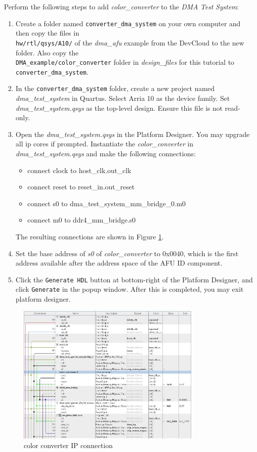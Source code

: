 \documentclass[11pt, twoside, pdftex]{article}
\begin{document}
\noindent
Perform the following steps to add {\it color\_converter} to the {\it DMA Test System}:
\begin{enumerate}
    \item Create a folder named \texttt{converter\_dma\_system} on your own computer and then copy the files in\\ \texttt{hw/rtl/qsys/A10/} of the \emph{dma\_afu} example from the DevCloud to the new folder. Also copy the\\ \texttt{DMA\_example/color\_converter} folder in {\it design\_files} for this tutorial to \texttt{converter\_dma\_system}. 
    \item In the \texttt{converter\_dma\_system} folder, create a new project named {\it dma\_test\_system} in Quartus. Select Arria 10 as the device family. Set {\it dma\_test\_system.qsys} as the top-level design. Ensure this file is not read-only.
    \item Open the {\it dma\_test\_system.qsys} in the Platform Designer. You may upgrade all ip cores if prompted. Instantiate the {\it color\_converter} in {\it dma\_test\_system.qsys} and make the following connections: 
        \begin{itemize}
            \item connect clock to host\_clk.out\_clk
            \item connect reset to reset\_in.out\_reset
            \item connect s0 to dma\_test\_system\_mm\_bridge\_0.m0
            \item connect m0 to ddr4\_mm\_bridge.s0
        \end{itemize}
    The resulting connections are shown in Figure \ref{fig:csc_connection}.
    \item Set the base address of {\it s0} of {\it color\_converter} to 0x0040, which is the first address available after the address space of the AFU ID component. 
    \item Click the \texttt{Generate HDL} button at bottom-right of the Platform Designer, and click \texttt{Generate} in the popup window. After this is completed, you may exit platform designer.
\end{enumerate}
\begin{figure}[H]
    \centering
    \includegraphics[width=0.8\textwidth]{figures/csc_ip_connection.JPG}
    \caption{color converter IP connection}
    \label{fig:csc_connection}
\end{figure}
\end{document}
